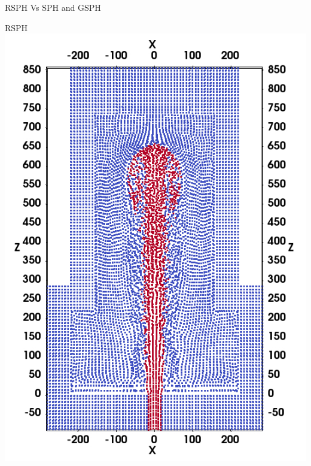 \documentclass{beamer}
\begin{document}
\begin{frame}{RSPH Vs SPH and GSPH}
\begin{minipage}{0.64 \textwidth}
\begin{minipage}[b][][b]{.49 \textwidth}
    \end{minipage}%
    \centering
    \begin{minipage}[b][][b]{.49 \textwidth}
        \centering \small{RSPH}
        \includegraphics[width=0.99 \textwidth]{./Chapter-4/Figures/RSPH-t3-cutView}
    \end{minipage}%
\end{minipage} 
\end{frame}
\end{document}
